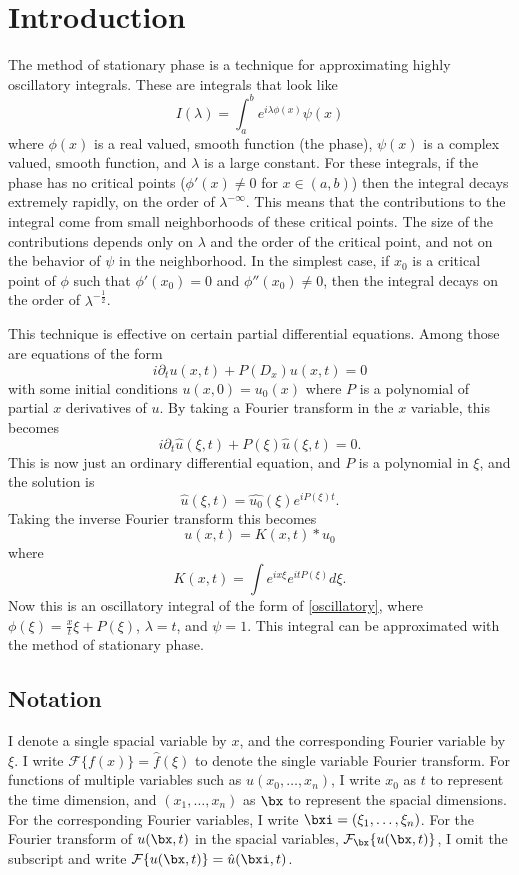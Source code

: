 \section{Introduction}
The method of stationary phase is a technique for approximating highly oscillatory integrals. These are integrals that look like
\begin{equation}
\label{oscillatory}
I(\lambda) = \int_a^b e^{i\lambda\phi(x)} \psi(x)
\end{equation}
where $\phi(x)$ is a real valued, smooth function (the phase), $\psi(x)$ is a complex valued, smooth function, and $\lambda$ is a large constant.
For these integrals, if the phase has no critical points ($\phi'(x) \neq 0$ for $x \in (a, b)$) then the integral decays extremely rapidly, on the order of $\lambda^{-\infty}$. This means that the contributions to the integral come from small neighborhoods of these critical points.
The size of the contributions depends only on $\lambda$ and the order of the critical point, and not on the behavior of $\psi$ in the neighborhood. In the simplest case, if $x_0$ is a critical point of $\phi$ such that $\phi'(x_0) = 0$ and $\phi''(x_0) \neq 0$, then the integral decays on the order of $\lambda^{-\frac{1}{2}}$.

This technique is effective on certain partial differential equations. Among those are equations of the form
\[
i\partial_t u(x, t) + P(D_x)u(x, t) = 0
\]
with some initial conditions $u(x, 0) = u_0(x)$ where $P$ is a polynomial of partial $x$ derivatives of $u$. 
By taking a Fourier transform in the $x$ variable, this becomes
\[
i\partial_t \hat{u}(\xi, t) + P(\xi)\hat{u}(\xi, t) = 0.
\]
This is now just an ordinary differential equation, and $P$ is a polynomial in $\xi$, and the solution is
\[
\hat{u}(\xi, t) = \hat{u_0}(\xi)e^{iP(\xi)t}.
\]
Taking the inverse Fourier transform this becomes
\[
u(x, t) = K(x, t) \ast u_0
\]
where
\[
K(x, t) = \int e^{ix\xi}e^{itP(\xi)}d\xi.
\]
Now this is an oscillatory integral of the form of \ref{oscillatory}, where $\phi(\xi) = \frac{x}{t}\xi + P(\xi)$, $\lambda = t$, and $\psi = 1$. This integral can be approximated with the method of stationary phase.

\subsection*{Notation}
I denote a single spacial variable by $x$, and the corresponding Fourier variable by $\xi$. I write $\mathcal{F}\{f(x)\} = \hat{f}(\xi)$ to denote the single variable Fourier transform. For functions of multiple variables such as $u(x_0, \ldots, x_n)$, I
 write $x_0$ as $t$ to represent the time dimension, and $(x_1, \ldots, x_n)$ as $\bx$ to represent the spacial dimensions. For the corresponding Fourier variables, I write $\bxi = (\xi_1, \ldots, \xi_n)$.
  For the Fourier transform of $u(\bx, t)$ in the spacial variables, $\mathcal{F}_{\bx} \{u(\bx, t)\}$, I omit the subscript and write
  $\mathcal{F}\{u(\bx, t)\} = \hat{u}(\bxi, t)$.